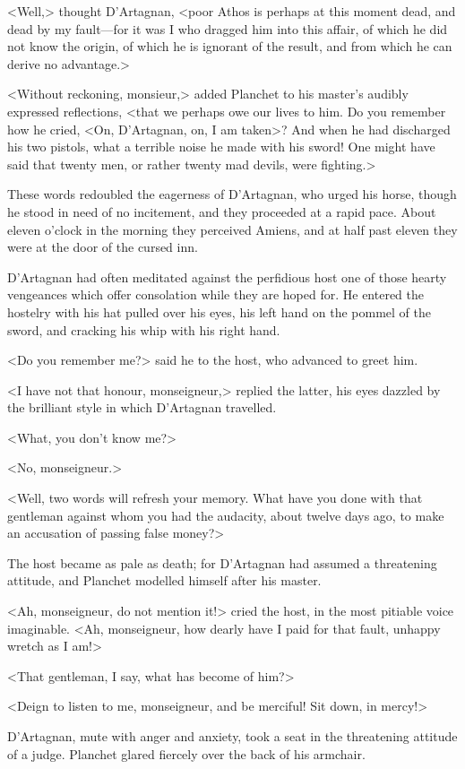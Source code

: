 <Well,> thought D'Artagnan, <poor Athos is perhaps at this moment dead, and dead by my fault—for it was I who dragged him into this affair, of which he did not know the origin, of which he is ignorant of the result, and from which he can derive no advantage.> 

<Without reckoning, monsieur,> added Planchet to his master's audibly expressed reflections, <that we perhaps owe our lives to him. Do you remember how he cried, <On, D'Artagnan, on, I am taken>? And when he had discharged his two pistols, what a terrible noise he made with his sword! One might have said that twenty men, or rather twenty mad devils, were fighting.> 

These words redoubled the eagerness of D'Artagnan, who urged his horse, though he stood in need of no incitement, and they proceeded at a rapid pace. About eleven o'clock in the morning they perceived Amiens, and at half past eleven they were at the door of the cursed inn. 

D'Artagnan had often meditated against the perfidious host one of those hearty vengeances which offer consolation while they are hoped for. He entered the hostelry with his hat pulled over his eyes, his left hand on the pommel of the sword, and cracking his whip with his right hand. 

<Do you remember me?> said he to the host, who advanced to greet him. 

<I have not that honour, monseigneur,> replied the latter, his eyes dazzled by the brilliant style in which D'Artagnan travelled. 

<What, you don't know me?> 

<No, monseigneur.> 

<Well, two words will refresh your memory. What have you done with that gentleman against whom you had the audacity, about twelve days ago, to make an accusation of passing false money?> 

The host became as pale as death; for D'Artagnan had assumed a threatening attitude, and Planchet modelled himself after his master. 

<Ah, monseigneur, do not mention it!> cried the host, in the most pitiable voice imaginable. <Ah, monseigneur, how dearly have I paid for that fault, unhappy wretch as I am!> 

<That gentleman, I say, what has become of him?> 

<Deign to listen to me, monseigneur, and be merciful! Sit down, in mercy!> 

D'Artagnan, mute with anger and anxiety, took a seat in the threatening attitude of a judge. Planchet glared fiercely over the back of his armchair. 

